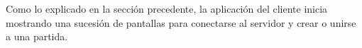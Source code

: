 Como lo explicado en la sección precedente, la aplicación del cliente inicia mostrando una sucesión de pantallas para conectarse al servidor y crear o unirse a una partida.

